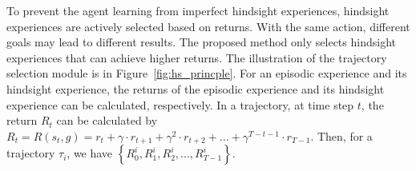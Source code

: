 To prevent the agent learning from imperfect hindsight experiences, {hindsight experiences are actively selected based on returns.} With the same action, different goals may lead to different results. The proposed method only selects hindsight experiences that can achieve higher returns. The illustration of the trajectory selection module is in Figure~\ref{fig:hs_princple}. For an episodic experience and its hindsight experience, the returns of the episodic experience and its hindsight experience can be calculated, respectively. 
In a trajectory, at time step $t$, the return $R_{t}$ can be calculated by $R_{t} = R(s_t, g) = r_{t} + \gamma \cdot r_{t+1} + \gamma^{2} \cdot r_{t+2} + ... + \gamma^{T-t-1} \cdot r_{T-1}$. Then, for a trajectory $\tau_{i}$, we have $\left\{R_{0}^{i}, R_{1}^{i}, R_{2}^{i}, ..., R_{T-1}^{i}\right\}$.

